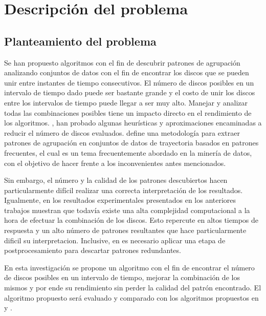 \chapter{Descripción del problema}


\section{Planteamiento del problema}

Se han propuesto algoritmos con el fin de descubrir patrones de agrupación analizando conjuntos de  datos con
el fin de encontrar los discos que se pueden unir entre instantes de tiempo consecutivos. El número de discos
posibles en un intervalo de tiempo dado puede ser bastante grande y el costo de unir los discos entre
los intervalos de tiempo puede llegar a ser muy alto. Manejar y analizar todas las combinaciones posibles tiene
un impacto directo en el rendimiento de los algoritmos. \cite{vieira2009line},  \cite{benkert2008reporting}
han probado algunas heurísticas y aproximaciones
encaminadas a reducir el número de discos evaluados.  \cite{romero2011mining} define una  metodología para
extraer patrones
de agrupación en conjuntos de datos de trayectoria basados en patrones frecuentes, el cual es un tema frecuentemente 
abordado en la minería de datos, con el objetivo de hacer frente a los inconvenientes antes mencionados. 

Sin  embargo,  el  número  y  la  calidad  de  los  patrones  descubiertos  hacen
particularmente difícil realizar una correcta interpretación de los resultados. Igualmente,
en \cite{vieira2009line} los resultados experimentales presentados en los anteriores trabajos muestran
que  todavía  existe  una  alta  complejidad  computacional  a  la  hora  de  efectuar  la
combinación  de  los  discos.  Esto  repercute  en  altos  tiempos  de  respuesta  y  un  alto
número  de  patrones  resultantes  que  hace  particularmente  dificil  su  interpretacion.
Inclusive, en \cite{romero2011mining} es necesario aplicar una etapa de postprocesamiento para descartar
patrones redundantes.

En  esta  investigación  se  propone  un  algoritmo  con  el  fin  de  encontrar  el  número  de
discos posibles en un intervalo de tiempo, mejorar la combinación de los mismos y por
ende su rendimiento sin perder la calidad del patrón encontrado. El algoritmo propuesto
será evaluado y comparado con los algoritmos propuestos en \cite{vieira2009line} y 
\cite{romero2011mining}.


